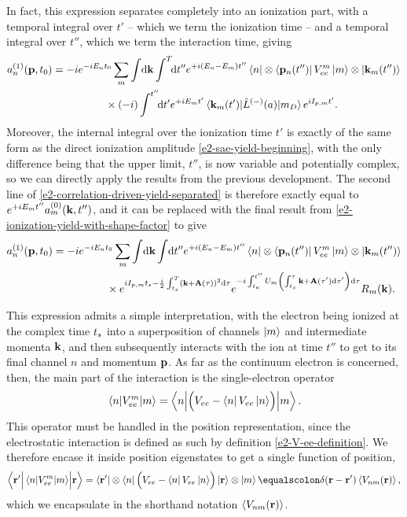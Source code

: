 In fact, this expression separates completely into an ionization part, with a temporal integral over $t'$ -- which we term the ionization time -- and a temporal integral over $t''$, which we term the interaction time, giving
\begin{align}
a_n^{(1)}(\vb{p},\tn)
& =
-i 
e^{-iE_n \tn}
\sum_m  \int\!\d\vb{k}   \int^T\!\!\d t''
e^{+i(E_n-E_m)t''}
\bra{n} \otimes \bra{\vb{p}_n(t'')}
V_{ee}^m
\ket{m}
\otimes 
\ket{\vb{k}_m(t'')}
\nonumber \\ & \qquad \qquad \quad  \times
(-i)\int^{t''}\!\!\d t'
e^{+iE_m t'}
\matrixel{\vb{k}_m(t')}{\hat{L}^{(-)}(a)}{m_D}e^{iI_{p,m} t'}.
\label{e2-correlation-driven-yield-separated}
\end{align}
Moreover, the internal integral over the ionization time $t'$ is exactly of the same form as the direct ionization amplitude \eqref{e2-sae-yield-beginning}, with the only difference being that the upper limit, $t''$, is now variable and potentially complex, so we can directly apply the results from the previous development. The second line of \eqref{e2-correlation-driven-yield-separated} is therefore exactly equal to $e^{+iE_mt''}a_m^{(0)}(\vb{k},t'')$, and it can be replaced with the final result from \eqref{e2-ionization-yield-with-shape-factor} to give
\begin{align}
a_n^{(1)}(\vb{p},{t_0})
& =
-i 
e^{-iE_n {t_0}}
\sum_m  \int\!\mathrm{d}\vb{k}   \int\!\mathrm{d} t''
e^{+i(E_n-E_m)t''}
\bra{n} \otimes \bra{\vb{p}_n(t'')}
V_{ee}^m
\ket{m}
\otimes 
\ket{\vb{k}_m(t'')}
\nonumber \\ & \qquad \qquad \quad  \times
e^{iI_{p,m} {t_s} - \frac{i}{2} \int_{{t_s}}^{T}\left(\vb{k}+\vb{A}(\tau)\right)^2\mathrm{d}\tau }
e^{-i\int_{t_\kappa}^{t''} U_m\left(\int_{ {t_s}}^\tau \vb{k}+\vb{A}(\tau')\mathrm{d}\tau'\right) \mathrm{d}\tau}
R_m(\vb{k})
.
\label{e2-correlation-driven-yield-with-a1-included}
\end{align}

This expression admits a simple interpretation, with the electron being ionized at the complex time ${t_s}$ into a superposition of channels $\ket{m}$ and intermediate momenta $\vb{k}$, and then subsequently interacts with the ion at time $t''$ to get to its final channel $n$ and momentum $\vb{p}$. As far as the continuum electron is concerned, then, the main part of the interaction is the single-electron operator
\begin{equation}
\matrixel{n}{V_{ee}^m}{m}
=
\matrixel**{n}{\left(\vphantom{\sum}V_{ee}-\bra{n}V_{ee}\ket{n}\right)}{m}.
\end{equation}
This operator must be handled in the position representation, since the electrostatic interaction is defined as such by definition \eqref{e2-V-ee-definition}. We therefore encase it inside position eigenstates to get a single function of position,
\begin{equation}
\matrixel**{\vbr'}{
\vphantom{\sum}
\matrixel{n}{V_{ee}^m}{m}
}{\vbr}
=
\bra{\vbr'}\otimes\bra{n}
{\left(\vphantom{\sum}V_{ee}-\bra{n}V_{ee}\ket{n}\right)}
\ket{\vbr}\otimes\ket{m}
\equalscolon
\delta(\vbr-\vbr')
\Vnm{\vbr},
\label{e2-Vnm-definition}
\end{equation}
which we encapsulate in the shorthand notation $\left\langle V_{nm}\mathopen{}\left( \vb{r} \right)\mathclose{} \right\rangle$.

